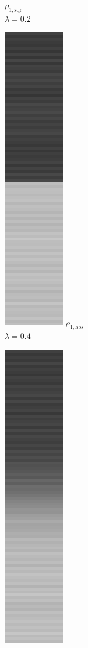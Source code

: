 \documentclass[onecolumn,final,a4paper,13pt,reqno]{siamart}
\begin{document}
\begin{figure}[t]
\begin{subfigure}[t]{0.08\textwidth}
		\scriptsize $\rho_{1,\text{sqr}}$\\[2px]
		\scriptsize $\lambda = 0.2$
	\end{subfigure}
	\begin{subfigure}[t]{0.08\textwidth}
		\includegraphics[scale=0.3]{pictures/denoising/signal/ipiano_absolute_04.png}
		\scriptsize $\rho_{1,\text{abs}}$\\[2px]
		\scriptsize $\lambda = 0.4$
	\end{subfigure}
	\begin{subfigure}[t]{0.08\textwidth}
		\includegraphics[scale=0.3]{pictures/denoising/signal/ipiano_squared_04.png}

\end{subfigure}
\end{figure}
\end{document}

